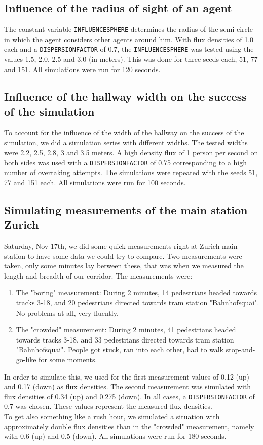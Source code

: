 \subsection{Influence of the radius of sight of an agent}
The constant variable \texttt{INFLUENCESPHERE} determines the radius of the semi-circle in which the agent considers other agents around him. With flux densities of 1.0 each and a \texttt{DISPERSIONFACTOR} of 0.7, the \texttt{INFLUENCESPHERE} was tested using the values 1.5, 2.0, 2.5 and 3.0 (in meters). This was done for three seeds each, 51, 77 and 151. All simulations were run for 120 seconds.

\subsection{Influence of the hallway width on the success of the simulation}
To account for the influence of the width of the hallway on the success of the simulation, we did a simulation series with different widths. The tested widths were 2.2, 2.5, 2.8, 3 and 3.5 meters. A high density flux of 1 person per second on both sides was used with a \texttt{DISPERSIONFACTOR} of 0.75 corresponding to a high number of overtaking attempts. The simulations were repeated with the seeds 51, 77 and 151 each. All simulations were run for 100 seconds.

\subsection{Simulating measurements of the main station Zurich}
Saturday, Nov 17th, we did some quick measurements right at Zurich main station to have some data we could try to compare. Two measurements were taken, only some minutes lay between these, that was when we measured the length and breadth of our corridor. The measurements were:
\begin{enumerate}
\item The "boring" measurement: During 2 minutes, 14 pedestrians headed towards tracks 3-18, and 20 pedestrians directed towards tram station "Bahnhofsquai". No problems at all, very fluently.
\item The "crowded" measurement: During 2 minutes, 41 pedestrians headed towards tracks 3-18, and 33 pedestrians directed towards tram station "Bahnhofsquai". People got stuck, ran into each other, had to walk stop-and-go-like for some moments.
\end{enumerate}
\noi In order to simulate this, we used for the first measurement values of 0.12 (up) and 0.17 (down) as flux densities. The second measurement was simulated with flux densities of 0.34 (up) and 0.275 (down). In all cases, a \texttt{DISPERSIONFACTOR} of 0.7 was chosen. These values represent the measured flux densities.\\
To get also something like a rush hour, we simulated a situation with approximately double flux densities than in the "crowded" measurement, namely with 0.6 (up) and 0.5 (down). All simulations were run for 180 seconds.

